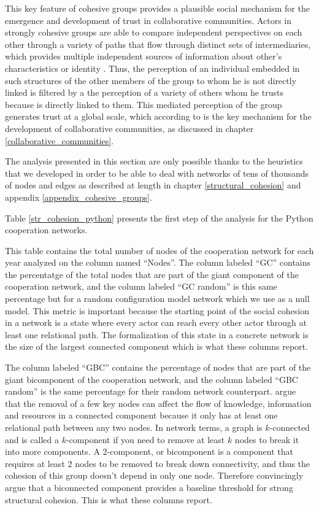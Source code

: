 This key feature of cohesive groups provides a plausible social mechanism for the emergence and development of trust in collaborative communities. Actors in strongly cohesive groups are able to compare independent perspectives on each other through a variety of paths that flow through distinct sets of intermediaries, which provides multiple independent sources of information about other's characteristics or identity \citep[320]{white:2001}. Thus, the perception of an individual embedded in such structures of the other members of the group to whom he is not directly linked is filtered by a the perception of a variety of others whom he trusts because is directly linked to them. This mediated perception of the group generates trust at a global scale, which according to \citet{adler:2006} is the key mechanism for the development of collaborative communities, as discussed in chapter \ref{collaborative_communities}.

The analysis presented in this section are only possible thanks to the heuristics that we developed in order to be able to deal with networks of tens of thousands of nodes and edges as described at length in chapter \ref{structural_cohesion} and appendix \ref{appendix_cohesive_groups}. 

Table \ref{str_cohesion_python} presents the first step of the analysis for the Python cooperation networks.



This table contains the total number of nodes of the cooperation network for each year analyzed on the column named ``Nodes''. The column labeled ``GC'' contains the percentatge of the total nodes that are part of the giant component of the cooperation network, and the column labeled ``GC random'' is this same percentage but for a random configuration model network which we use as a null model. This metric is important because the starting point of the social cohesion in a network is a state where every actor can reach every other actor through at least one relational path. The formalization of this state in a concrete network is the size of the largest connected component which is what these columns report. 

The column labeled ``GBC'' contains the percentage of nodes that are part of the giant bicomponent of the cooperation network, and the column labeled ``GBC random'' is the same percentage for their random network counterpart. \citet{moody:2003} argue that the removal of a few key nodes can affect the flow of knowledge, information and resources in a connected component because it only has at least one relational path between any two nodes. In network terms, a graph is $k$-connected and is called a $k$-component if you need to remove at least $k$ nodes to break it into more components. A 2-component, or bicomponent is a component that requires at least 2 nodes to be removed to break down connectivity, and thus the cohesion of this group doesn't depend in only one node. Therefore \citet{moody:2003} convincingly argue that a biconnected component provides a baseline threshold for strong structural cohesion. This is what these columns report.

